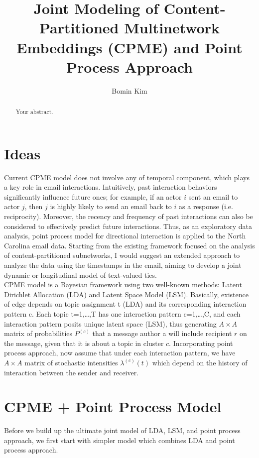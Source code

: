 \documentclass[a4paper]{article}
\title{Joint Modeling of Content-Partitioned Multinetwork Embeddings (CPME) and Point Process Approach}
\author{Bomin Kim}
\begin{document}
\maketitle

\begin{abstract}
Your abstract.
\end{abstract}

\section{Ideas}
Current CPME model does not involve any of temporal component, which plays a key role in email interactions. Intuitively, past interaction behaviors significantly influence future ones; for example, if an actor $i$ sent an email to actor $j$, then $j$ is highly likely to send an email back to $i$ as a response (i.e. reciprocity). Moreover, the recency and frequency of past interactions can also be considered to effectively predict future interactions. Thus, as an exploratory data analysis, point process model for directional interaction is applied to the North Carolina email data. Starting from the existing framework focused on the analysis of content-partitioned subnetworks, I would suggest an extended approach to analyze the data using the timestamps in the email, aiming to develop a joint dynamic or longitudinal model of text-valued ties.\\ \newline
 CPME model is a Bayesian framework using two well-known methods: Latent Dirichlet Allocation (LDA) and Latent Space Model (LSM). Basically, existence of edge depends on topic assignment t (LDA) and its corresponding interaction pattern c. Each topic t=1,…,T has one interaction pattern c=1,…,C, and each interaction pattern posits unique latent space (LSM), thus generating $A\times A$ matrix of probabilities $P^{(c)}$ that a message author
a will include recipient $r$ on the message, given that it is about
a topic in cluster $c$.  Incorporating point process approach, now assume that under each interaction pattern, we have $A\times A$ matrix of stochastic intensities $\lambda^{(c)}(t)$ which depend on the history of interaction between the sender and receiver. 
\newpage
\section{CPME + Point Process Model}
Before we build up the ultimate joint model of LDA, LSM, and point process approach, we first start with simpler model which combines LDA and point process approach.
\end{document}
